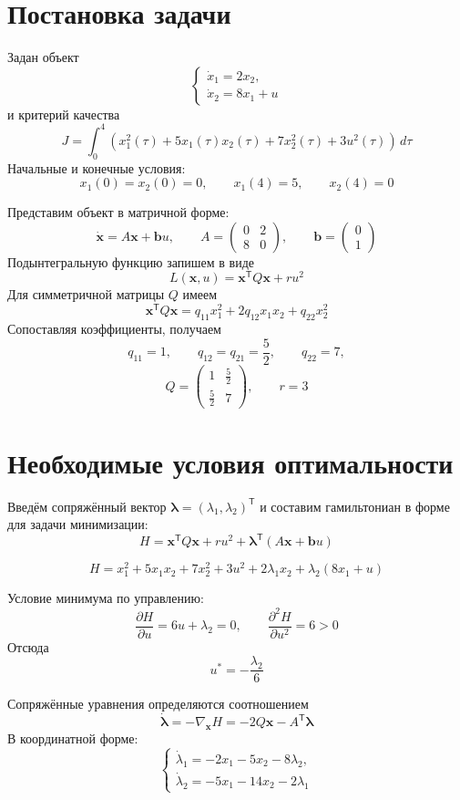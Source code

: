 
\section{Постановка задачи}

Задан объект
\[
\begin{cases}
\dot x_1=2x_2,\\
\dot x_2=8x_1+u
\end{cases}
\]
и критерий качества
\[
J=\int_0^4\left(x_1^2(\tau)+5x_1(\tau)x_2(\tau)
+7x_2^2(\tau)+3u^2(\tau)\right)\,d\tau
\]
Начальные и конечные условия:
\[
x_1(0)=x_2(0)=0,
\qquad x_1(4)=5,
\qquad x_2(4)=0
\]

Представим объект в матричной форме:
\[
\dot{\bm x}=A\bm x+\bm b u,
\qquad
A=\begin{pmatrix}0&2\\8&0\end{pmatrix},
\qquad
\bm b=\begin{pmatrix}0\\1\end{pmatrix}
\]
Подынтегральную функцию запишем в виде
\[
L(\bm x,u)=\bm x^{\mathsf T}Q\bm x+ru^2
\]
Для симметричной матрицы $Q$ имеем
\[
\bm x^{\mathsf T}Q\bm x
=q_{11}x_1^2+2q_{12}x_1x_2+q_{22}x_2^2
\]
Сопоставляя коэффициенты, получаем
\[
q_{11}=1,\qquad q_{12}=q_{21}=\frac52,\qquad q_{22}=7,
\]
\[
Q=\begin{pmatrix}1&\frac52\\[0.4ex]\frac52&7\end{pmatrix},
\qquad r=3
\]

\section{Необходимые условия оптимальности}

Введём сопряжённый вектор
$\bm\lambda=(\lambda_1,\lambda_2)^{\mathsf T}$
и составим гамильтониан в форме для задачи минимизации:
\[
H=\bm x^{\mathsf T}Q\bm x+ru^2
+\bm\lambda^{\mathsf T}(A\bm x+\bm b u)
\]

\[
H=x_1^2+5x_1x_2+7x_2^2+3u^2
+2\lambda_1x_2+\lambda_2(8x_1+u)
\]

Условие минимума по управлению:
\[
\frac{\partial H}{\partial u}=6u+\lambda_2=0,
\qquad
\frac{\partial^2 H}{\partial u^2}=6>0
\]
Отсюда
\[
\boxed{u^*=-\frac{\lambda_2}{6}}
\]

Сопряжённые уравнения определяются соотношением
\[
\dot{\bm\lambda}
=-\nabla_{\bm x}H
=-2Q\bm x-A^{\mathsf T}\bm\lambda
\]
В координатной форме:
\[
\begin{cases}
\dot\lambda_1=-2x_1-5x_2-8\lambda_2,\\
\dot\lambda_2=-5x_1-14x_2-2\lambda_1
\end{cases}
\]

